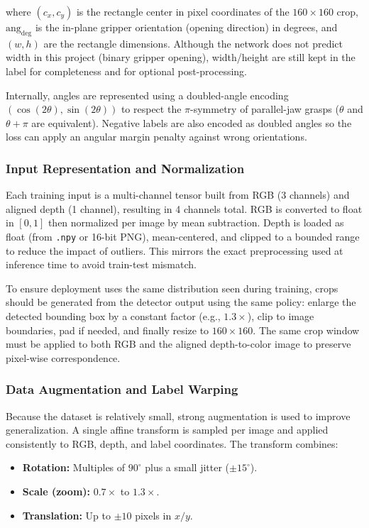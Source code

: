 \noindent where $(c_x, c_y)$ is the rectangle center in pixel coordinates of the $160 \times 160$ crop, $\text{ang}_{\text{deg}}$ is the in-plane gripper orientation (opening direction) in degrees, and $(w, h)$ are the rectangle dimensions. Although the network does not predict width in this project (binary gripper opening), width/height are still kept in the label for completeness and for optional post-processing.

Internally, angles are represented using a doubled-angle encoding $(\cos(2\theta), \sin(2\theta))$ to respect the $\pi$-symmetry of parallel-jaw grasps ($\theta$ and $\theta+\pi$ are equivalent). Negative labels are also encoded as doubled angles so the loss can apply an angular margin penalty against wrong orientations.
\subsubsection{Input Representation and Normalization}
Each training input is a multi-channel tensor built from RGB (3 channels) and aligned depth (1 channel), resulting in 4 channels total. RGB is converted to float in $[0, 1]$ then normalized per image by mean subtraction. Depth is loaded as float (from \texttt{.npy} or 16-bit PNG), mean-centered, and clipped to a bounded range to reduce the impact of outliers. This mirrors the exact preprocessing used at inference time to avoid train-test mismatch.

To ensure deployment uses the same distribution seen during training, crops should be generated from the detector output using the same policy: enlarge the detected bounding box by a constant factor (e.g., $1.3\times$), clip to image boundaries, pad if needed, and finally resize to $160 \times 160$. The same crop window must be applied to both RGB and the aligned depth-to-color image to preserve pixel-wise correspondence.

\subsubsection{Data Augmentation and Label Warping}
Because the dataset is relatively small, strong augmentation is used to improve generalization. A single affine transform is sampled per image and applied consistently to RGB, depth, and label coordinates. The transform combines:

\begin{itemize}
    \item \textbf{Rotation:} Multiples of $90^\circ$ plus a small jitter ($\pm 15^\circ$).
    \item \textbf{Scale (zoom):} $0.7\times$ to $1.3\times$.
    \item \textbf{Translation:} Up to $\pm 10$ pixels in $x/y$.
\end{itemize}

